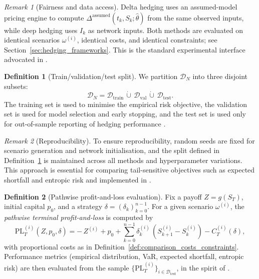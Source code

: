 \documentclass[12pt,a4paper]{article}
\theoremstyle{definition}
\newtheorem{definition}{Definition}[section]
\theoremstyle{plain}
\theoremstyle{remark}
\newtheorem{remark}{Remark}[section]
\theoremstyle{plain}
\begin{document}
\begin{remark}[Fairness and data access]
\label{rem:data_access}
Delta hedging uses an assumed-model pricing engine to compute $\Delta^{\mathrm{assumed}}(t_k,S_k;\hat\theta)$ from the same observed inputs, while deep hedging uses $I_k$ as network inputs. 
Both methods are evaluated on identical scenarios $\omega^{(i)}$, identical costs, and identical constraints; see Section~\ref{sec:hedging_frameworks}. 
This is the standard experimental interface advocated in \cite{Buehler2019DeepHedging}.
\end{remark}

\begin{definition}[Train/validation/test split]
\label{def:split}
We partition $\mathcal{D}_N$ into three disjoint subsets:
\[
\mathcal{D}_N = \mathcal{D}_{\mathrm{train}} \,\dot\cup\, \mathcal{D}_{\mathrm{val}} \,\dot\cup\, \mathcal{D}_{\mathrm{test}}.
\]
The training set is used to minimise the empirical risk objective, the validation set is used for model selection and early stopping, and the test set is used only for out-of-sample reporting of hedging performance \cite{Buehler2019DeepHedging,Horvath2021DeepRough}.
\end{definition}

\begin{remark}[Reproducibility]
\label{rem:reproducibility}
To ensure reproducibility, random seeds are fixed for scenario generation and network initialisation, and the split defined in Definition~\ref{def:split} is maintained across all methods and hyperparameter variations.
This approach is essential for comparing tail-sensitive objectives such as expected shortfall and entropic risk \cite{FoellmerSchied2016} and implemented in \cite{Buehler2019DeepHedging}.
\end{remark}

\begin{definition}[Pathwise profit-and-loss evaluation]
\label{def:pathwise_pl_eval}
Fix a payoff $Z=g(S_T)$, initial capital $p_0$, and a strategy $\delta=(\delta_k)_{k=0}^{n-1}$. 
For a given scenario $\omega^{(i)}$, the \emph{pathwise terminal profit-and-loss} is computed by
\[
\mathrm{PL}_T^{(i)}(Z,p_0,\delta)
=
-\,Z^{(i)} + p_0 + \sum_{k=0}^{n-1}\delta_k^{(i)}\,(S_{k+1}^{(i)}-S_k^{(i)}) - C_T^{(i)}(\delta),
\]
with proportional costs as in Definition~\ref{def:comparison_costs_constraints}. 
Performance metrics (empirical distribution, VaR, expected shortfall, entropic risk) are then evaluated from the sample $\{\mathrm{PL}_T^{(i)}\}_{i\in\mathcal{D}_{\mathrm{test}}}$, in the spirit of \cite{Buehler2019DeepHedging}.
\end{definition}
\end{document}
